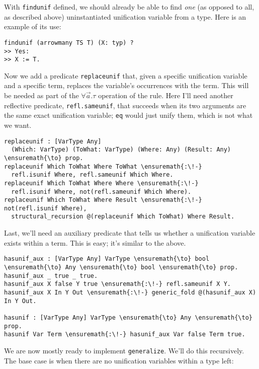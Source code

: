 With \texttt{findunif} defined, we should already be able to find
\emph{one} (as opposed to all, as described above) uninstantiated
unification variable from a type. Here is an example of its use:

\begin{verbatim}
findunif (arrowmany TS T) (X: typ) ?
>> Yes:
>> X := T.
\end{verbatim}

Now we add a predicate \texttt{replaceunif} that, given a specific
unification variable and a specific term, replaces the variable's
occurrences with the term. This will be needed as part of the
\(\forall \vec{a}.\tau\) operation of the rule. Here I'll need another
reflective predicate, \texttt{refl.sameunif}, that succeeds when its two
arguments are the same exact unification variable; \texttt{eq} would
just unify them, which is not what we want.

\begin{verbatim}
replaceunif : [VarType Any]
  (Which: VarType) (ToWhat: VarType) (Where: Any) (Result: Any) \ensuremath{\to} prop.
replaceunif Which ToWhat Where ToWhat \ensuremath{:\!-}
  refl.isunif Where, refl.sameunif Which Where.
replaceunif Which ToWhat Where Where \ensuremath{:\!-}
  refl.isunif Where, not(refl.sameunif Which Where).
replaceunif Which ToWhat Where Result \ensuremath{:\!-} not(refl.isunif Where),
  structural_recursion @(replaceunif Which ToWhat) Where Result.
\end{verbatim}

Last, we'll need an auxiliary predicate that tells us whether a
unification variable exists within a term. This is easy; it's similar to
the above.

\begin{verbatim}
hasunif_aux : [VarType Any] VarType \ensuremath{\to} bool \ensuremath{\to} Any \ensuremath{\to} bool \ensuremath{\to} prop.
hasunif_aux _ true _ true.
hasunif_aux X false Y true \ensuremath{:\!-} refl.sameunif X Y.
hasunif_aux X In Y Out \ensuremath{:\!-} generic_fold @(hasunif_aux X) In Y Out.

hasunif : [VarType Any] VarType \ensuremath{\to} Any \ensuremath{\to} prop.
hasunif Var Term \ensuremath{:\!-} hasunif_aux Var false Term true.
\end{verbatim}

We are now mostly ready to implement \texttt{generalize}. We'll do this
recursively. The base case is when there are no unification variables
within a type left:

\importantCodeblock{}

